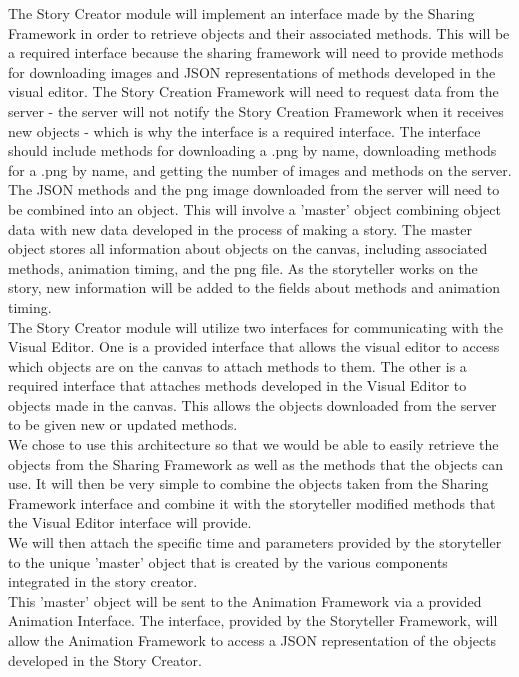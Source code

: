 \documentclass[12pt]{article}
\begin{document}
The Story Creator module will implement an interface made by the Sharing Framework in order to retrieve objects and their associated methods.  This will be a required interface because the sharing framework will need to provide methods for downloading images and JSON representations of methods developed in the visual editor. The Story Creation Framework will need to request data from the server - the server will not notify the Story Creation Framework when it receives new objects - which is why the interface is a required interface. The interface should include methods for downloading a .png by name, downloading methods for a .png by name, and getting the number of images and methods on the server. \\

The JSON methods and the png image downloaded from the server will need to be combined into an object. This will involve a 'master' object combining object data with new data developed in the process of making a story. The master object stores all information about objects on the canvas, including associated methods, animation timing, and the png file. As the storyteller works on the story, new information will be added to the fields about methods and animation timing. \\

The Story Creator module will utilize two interfaces for communicating with the Visual Editor. One is a provided interface that allows the visual editor to access which objects are on the canvas to attach methods to them. The other is a required interface that attaches methods developed in the Visual Editor to objects made in the canvas. This allows the objects downloaded from the server to be given new or updated methods. \\

We chose to use this architecture so that we would be able to easily retrieve the objects from the Sharing Framework as well as the methods that the objects can use.  It will then be very simple to combine the objects taken from the Sharing Framework interface and combine it with the storyteller modified methods that the Visual Editor interface will provide.  \\

We will then attach the specific time and parameters provided by the storyteller to the unique 'master' object that is created by the various components integrated in the story creator. \\ 

This 'master' object will be sent to the Animation Framework via a provided Animation Interface. The interface, provided by the Storyteller Framework, will allow the Animation Framework to access a JSON representation of the objects developed in the Story Creator. \\
\end{document}
